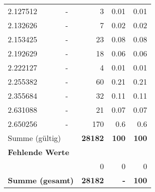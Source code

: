 \begin{longtable}{lXrrr}
        2.127512 & \multicolumn{1}{X}{-} & %
          \num{3} &
          \num[round-mode=places,round-precision=2]{0,01} &
          \num[round-mode=places,round-precision=2]{0,01} \\

        2.132626 & \multicolumn{1}{X}{-} & %
          \num{7} &
          \num[round-mode=places,round-precision=2]{0,02} &
          \num[round-mode=places,round-precision=2]{0,02} \\

        2.153425 & \multicolumn{1}{X}{-} & %
          \num{23} &
          \num[round-mode=places,round-precision=2]{0,08} &
          \num[round-mode=places,round-precision=2]{0,08} \\

        2.192629 & \multicolumn{1}{X}{-} & %
          \num{18} &
          \num[round-mode=places,round-precision=2]{0,06} &
          \num[round-mode=places,round-precision=2]{0,06} \\

        2.222127 & \multicolumn{1}{X}{-} & %
          \num{4} &
          \num[round-mode=places,round-precision=2]{0,01} &
          \num[round-mode=places,round-precision=2]{0,01} \\

        2.255382 & \multicolumn{1}{X}{-} & %
          \num{60} &
          \num[round-mode=places,round-precision=2]{0,21} &
          \num[round-mode=places,round-precision=2]{0,21} \\

        2.355684 & \multicolumn{1}{X}{-} & %
          \num{32} &
          \num[round-mode=places,round-precision=2]{0,11} &
          \num[round-mode=places,round-precision=2]{0,11} \\

        2.631088 & \multicolumn{1}{X}{-} & %
          \num{21} &
          \num[round-mode=places,round-precision=2]{0,07} &
          \num[round-mode=places,round-precision=2]{0,07} \\

        2.650256 & \multicolumn{1}{X}{-} & %
          \num{170} &
          \num[round-mode=places,round-precision=2]{0,6} &
          \num[round-mode=places,round-precision=2]{0,6} \\

     \midrule
     \multicolumn{2}{l}{Summe (gültig)} &
       \textbf{\num{28182}} &
     \textbf{100} &
       \textbf{\num[round-mode=places,round-precision=2]{100}} \\
     \multicolumn{5}{l}{\textbf{Fehlende Werte}}\\
      & & 0 & 0 & 0 \\
     \midrule
     \multicolumn{2}{l}{\textbf{Summe (gesamt)}} &
          \textbf{\num{28182}} &
        \textbf{-} &
        \textbf{100} \\
     \bottomrule
     \end{longtable}
     
